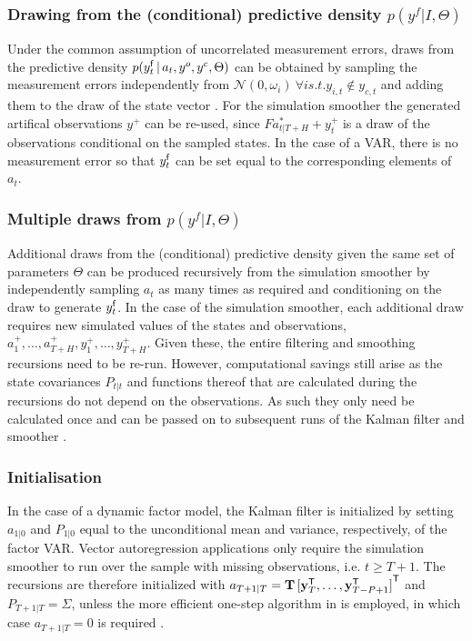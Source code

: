 \documentclass[notitlepage,a4paper,12pt]{article}
\newcommand{\transpose}[1]{{#1}^{\sf{T}}}
\begin{document}
\subsubsection{Drawing from the (conditional) predictive density $p(y^f|I, \Theta)$}
Under the common assumption of uncorrelated measurement errors, draws from the predictive density $p(y^{\sf{f}}_t\,|\,a_t, y^o, y^c, \Theta)$ can  be obtained by sampling the measurement errors independently from $\mathcal{N}(0, \omega_i) \: \forall i s.t. y_{i,t} \notin y_{c,t}$ and adding them to the draw of the state vector \citep[see][for the general case of a full covariance matrix $\Omega$]{bgl_2015ijf}. For the \citet{durbinkoopman2002_biomtr} simulation smoother the generated artifical observations $y^+$ can be re-used, since $F a^*_{t|T+H} + y^+_t$ is a draw of the observations conditional on the sampled states. In the case of a VAR, there is no 
measurement error so that $y^{\sf{f}}_t$ can be set equal to the corresponding elements of $a_t$. 

\subsubsection{Multiple draws from $p(y^f|I, \Theta)$}
Additional draws from the (conditional) predictive density given the same set of parameters $\Theta$ can be produced recursively from the \citet{carterkohn1994_biomtr} simulation smoother by independently sampling $a_t$ as many times as required and conditioning on the draw to generate $y^{\sf{f}}_t$. In the case of the \citet{durbinkoopman2002_biomtr} simulation smoother, each additional draw requires new simulated values of the states and observations, $a^+_1, \dots, a^+_{T+H}, y^+_1, \dots, y^+_{T+H}$. Given these, the entire filtering and smoothing recursions need to be re-run. However, computational savings still arise as the state covariances $P_{t|t}$ and functions thereof that are calculated during the recursions do not depend on the observations. As such they only need be calculated once and can be passed on to subsequent runs of the Kalman filter and smoother \citep[p. 606]{durbinkoopman2002_biomtr}.

\subsubsection{Initialisation}
In the case of a dynamic factor model, the Kalman filter is initialized by setting $a_{1|0}$ and $P_{1|0}$ equal to the unconditional mean and variance, respectively, of the factor VAR. Vector autoregression applications only require the simulation smoother to run over the sample with missing observations, i.e. $t\geq T+1$. The recursions are therefore initialized with $a_{T+1|T} = \mathbf{T} \, \transpose{[\transpose{\mathbf{y}}_T, \dots, \transpose{\mathbf{y}}_{T-P+1}]}$ and $P_{T+1|T} = \Sigma$, unless the more efficient one-step algorithm in \citet{durbinkoopman2002_biomtr} is employed, in which case $a_{T+1|T} = 0$ is required \citep[see][]{jarocinski2015csda}.
\end{document}
